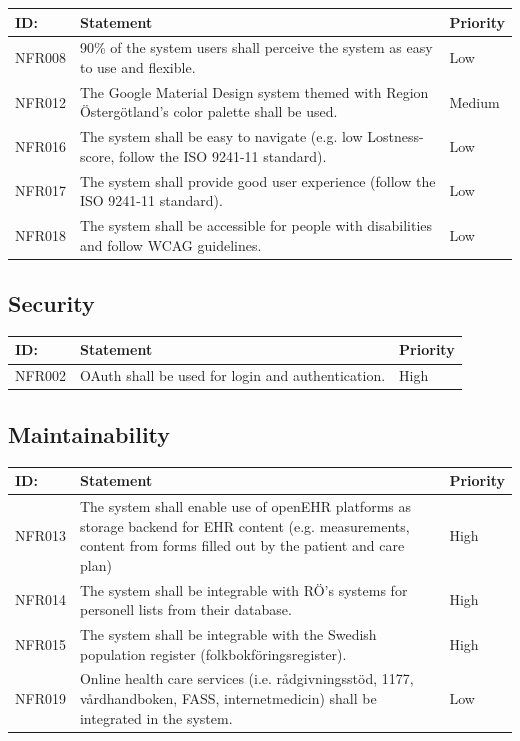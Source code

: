 \documentclass{scrreprt}
\begin{document}
\begin{center}
\begin{tabularx}{\linewidth}{| l | X | l |}
\hline
\textbf{ID:} & \textbf{Statement} & \textbf{Priority} \\
\hline
NFR008 & 
90\% of the system users shall perceive the system as easy to use and flexible. & 
Low \\ 
\hline
NFR012 & 
The Google Material Design system themed with Region Östergötland’s color palette shall be used. & 
Medium \\ 
\hline
NFR016 & 
The system shall be easy to navigate (e.g. low Lostness-score, follow the ISO 9241-11 standard). &
Low \\ 
\hline
NFR017 & 
The system shall provide good user experience (follow the ISO 9241-11 standard). & 
Low \\ 
\hline
NFR018 & 
The system shall be accessible for people with disabilities and follow WCAG guidelines. &
Low \\ 
\hline
\end{tabularx}
\end{center}

\subsection{Security}

\begin{center}
\begin{tabularx}{\linewidth}{| l | X | l |}
\hline
\textbf{ID:} & \textbf{Statement} & \textbf{Priority} \\
\hline
NFR002 & 
OAuth shall be used for login and authentication. &
High \\ 
 \hline
\end{tabularx}
\end{center}

\subsection{Maintainability}

\begin{center}
\begin{tabularx}{\linewidth}{| l | X | l |}
\hline
\textbf{ID:} & \textbf{Statement} & \textbf{Priority} \\
\hline
NFR013 & 
The system shall enable use of openEHR platforms as storage backend for EHR content (e.g. measurements, content from forms filled out by the patient and care plan) &
High \\ 
 \hline
NFR014 & 
The system shall be integrable with RÖ’s systems for personell lists from their database.&
High \\ 
\hline 
NFR015 & 
The system shall be integrable with the Swedish population register (folkbokföringsregister).& 
High \\ 
\hline
NFR019 & 
Online health care services (i.e. rådgivningsstöd, 1177, vårdhandboken, FASS, internetmedicin) shall be integrated in the system.& 
Low \\ 
\hline
\end{tabularx}
\end{center}
\end{document}
